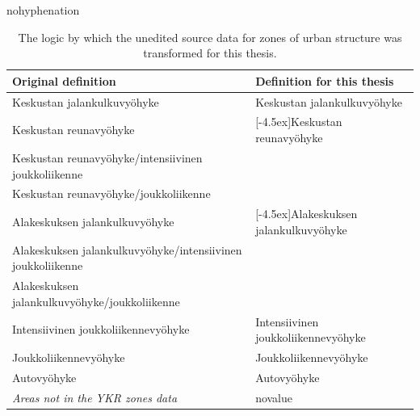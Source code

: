 \begin{hyphenrules}{nohyphenation}
    \begin{table}[H]%
        \centering
        \def\arraystretch{1.2}
        \setlength\tabcolsep{1.2ex}
        \caption[YKR zones processing]{The logic by which the unedited source data for zones of urban structure was transformed for this thesis.}
        \label{tab:ykr_zones_simplify}
        \scalebox{0.9}
        {\begin{tabular}{ @{} >{\raggedright\arraybackslash}p{6cm} >{\raggedright\arraybackslash}p{6cm} @{} }
            \toprule
            Original definition & Definition for this thesis \\
            \midrule
            Keskustan jalankulkuvyöhyke & Keskustan jalankulkuvyöhyke \\
            \greyrule
            Keskustan reunavyöhyke & \multirow{3}{*}[-4.5ex]{Keskustan reunavyöhyke} \\
            Keskustan reunavyöhyke/intensiivinen joukkoliikenne & \\
            Keskustan reunavyöhyke/joukkoliikenne & \\
            \greyrule
            Alakeskuksen jalankulkuvyöhyke & \multirow{3}{*}[-4.5ex]{Alakeskuksen jalankulkuvyöhyke} \\
            Alakeskuksen jalankulkuvyöhyke/intensiivinen joukkoliikenne & \\
            Alakeskuksen jalankulkuvyöhyke/joukkoliikenne & \\
            \greyrule
            Intensiivinen joukkoliikennevyöhyke & Intensiivinen joukkoliikennevyöhyke \\ 
            \greyrule
            Joukkoliikennevyöhyke & Joukkoliikennevyöhyke \\
            \greyrule
            Autovyöhyke & Autovyöhyke \\
            \greyrule
            \textit{Areas not in the YKR zones data} & novalue \\
            \bottomrule
        \end{tabular}}
    \end{table} 
\end{hyphenrules}

